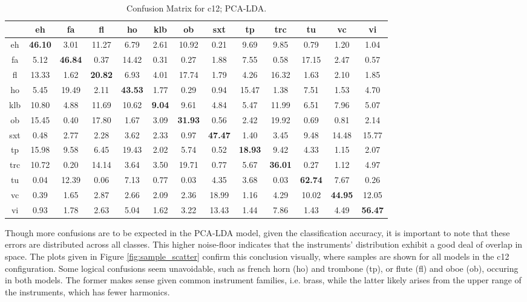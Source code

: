 \begin{landscape}
\begin{table*} %
\begin{center}
\caption{Confusion Matrix for c12; PCA-LDA.}
\begin{tabular}{c | cccccccccccc}
\hline
     &    eh &    fa &   fl &    ho &   klb &    ob &   sxt &    tp &   trc &    tu &    vc &    vi \\
\hline
 eh  & \textbf{46.10} &  3.01 & 11.27 &  6.79 &  2.61 & 10.92 &  0.21 &  9.69 &  9.85 &  0.79 &  1.20 &  1.04 \\
 fa  &  5.12 & \textbf{46.84} &  0.37 & 14.42 &  0.31 &  0.27 &  1.88 &  7.55 &  0.58 & 17.15 &  2.47 &  0.57 \\
 fl & 13.33 &  1.62 & \textbf{20.82} &  6.93 &  4.01 & 17.74 &  1.79 &  4.26 & 16.32 &  1.63 &  2.10 &  1.85 \\
 ho  &  5.45 & 19.49 &  2.11 & \textbf{43.53} &  1.77 &  0.29 &  0.94 & 15.47 &  1.38 &  7.51 &  1.53 &  4.70 \\
 klb & 10.80 &  4.88 & 11.69 & 10.62 &  \textbf{9.04} &  9.61 &  4.84 &  5.47 & 11.99 &  6.51 &  7.96 &  5.07 \\
 ob  & 15.45 &  0.40 & 17.80 &  1.67 &  3.09 & \textbf{31.93} &  0.56 &  2.42 & 19.92 &  0.69 &  0.81 &  2.14 \\
 sxt &  0.48 &  2.77 &  2.28 &  3.62 &  2.33 &  0.97 & \textbf{47.47} &  1.40 &  3.45 &  9.48 & 14.48 & 15.77 \\
 tp  & 15.98 &  9.58 &  6.45 & 19.43 &  2.02 &  5.74 &  0.52 & \textbf{18.93} &  9.42 &  4.33 &  1.15 &  2.07 \\
 trc & 10.72 &  0.20 & 14.14 &  3.64 &  3.50 & 19.71 &  0.77 &  5.67 & \textbf{36.01} &  0.27 &  1.12 &  4.97 \\
 tu  &  0.04 & 12.39 &  0.06 &  7.13 &  0.77 &  0.03 &  4.35 &  3.68 &  0.03 & \textbf{62.74} &  7.67 &  0.26 \\
 vc  &  0.39 &  1.65 &  2.87 &  2.66 &  2.09 &  2.36 & 18.99 &  1.16 &  4.29 & 10.02 & \textbf{44.95} & 12.05 \\
 vi  &  0.93 &  1.78 &  2.63 &  5.04 &  1.62 &  3.22 & 13.43 &  1.44 &  7.86 &  1.43 &  4.49 & \textbf{56.47} \\
\hline
\end{tabular}
\label{tab:things}
\end{center}
\end{table*}
\end{landscape}

Though more confusions are to be expected in the PCA-LDA model, given the classification accuracy, it is important to note that these errors are distributed across all classes.
This higher noise-floor indicates that the instruments' distribution exhibit a good deal of overlap in space.
The plots given in Figure \ref{fig:sample_scatter} confirm this conclusion visually, where samples are shown for all models in the c12 configuration.
Some logical confusions seem unavoidable, such as french horn (ho) and trombone (tp), or flute (fl) and oboe (ob), occuring in both models.
The former makes sense given common instrument families, i.e. brass, while the latter likely arises from the upper range of the instruments, which has fewer harmonics.

